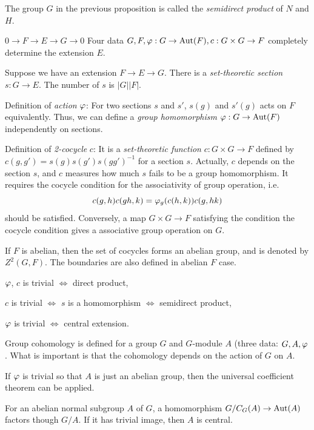 \documentclass{../../large}
\begin{document}
\begin{defn}
The group $G$ in the previous proposition is called the \emph{semidirect product} of $N$ and $H$.
\end{defn}


$0\to F\to E\to G\to0$
Four data $G,F,\varphi:G\to\operatorname{Aut}(F),c:G\times G\to F$ completely determine the extension $E$.

Suppose we have an extension $F\to E\to G$.
There is a \emph{set-theoretic section} $s:G\to E$.
The number of $s$ is $|G||F|$.

Definition of \emph{action} $\varphi$:
For two sections $s$ and $s'$, $s(g)$ and $s'(g)$ acts on $F$ equivalently.
Thus, we can define a \emph{group homomorphism} $\varphi:G\to\operatorname{Aut}(F)$ independently on sections.

Definition of \emph{2-cocycle} $c$:
It is a \emph{set-theoretic function} $c:G\times G\to F$ defined by $c(g,g')=s(g)s(g')s(gg')^{-1}$ for a section $s$.
Actually, $c$ depends on the section $s$, and $c$ measures how much $s$ fails to be a group homomorphism.
It requires the cocycle condition for the associativity of group operation, i.e.
\[c(g,h)c(gh,k)=\varphi_g(c(h,k))c(g,hk)\]
should be satisfied.
Conversely, a map $G\times G\to F$ satisfying the condition the cocycle condition gives a associative group operation on $G$.

If $F$ is abelian, then the set of cocycles forms an abelian group, and is denoted by $Z^2(G,F)$.
The boundaries are also defined in abelian $F$ case.


\begin{parts}
\item $\varphi$, $c$ is trivial $\iff$ direct product,
\item $c$ is trivial $\iff$ $s$ is a homomorphism $\iff$ semidirect product,
\item $\varphi$ is trivial $\iff$ central extension.
\end{parts}

Group cohomology is defined for a group $G$ and $G$-module $A$ (three data: $G,A,\varphi$.
What is important is that the cohomology depends on the action of $G$ on $A$.

If $\varphi$ is trivial so that $A$ is just an abelian group, then the universal coefficient theorem can be applied.




\begin{prb}
For an abelian normal subgroup $A$ of $G$, a homomorphism $G/C_G(A)\to\operatorname{Aut}(A)$ factors though $G/A$.
If it has trivial image, then $A$ is central.
\end{prb}
\end{document}
